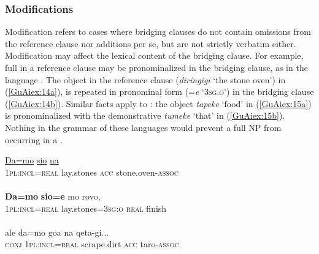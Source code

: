 \documentclass[output=paper]{LSP/langsci}
\begin{document}
\subsubsection{Modifications}
\label{GuAi311modif}
Modification refers to cases where bridging clauses do not contain omissions from the reference clause nor additions per se, but are not strictly verbatim either. Modification may affect the lexical content of the bridging clause. For example, full  in a reference clause may be pronominalized in the bridging clause, as in the  language . The object in the reference clause (\textit{diringigi} `the stone oven') in (\ref{GuAiex:14a}), is repeated in pronominal form (=\textit{e} `\textsc{3sg.o}') in the bridging clause (\ref{GuAiex:14b}). Similar facts apply to : the object \textit{tapeke} `food' in (\ref{GuAiex:15a}) is pronominalized with the demonstrative \textit{tumeke} `that' in (\ref{GuAiex:15b}). Nothing in the grammar of these languages would prevent a full NP from occurring in a .


\begin{exe}
\ex \label{GuAiex:14ac}
\begin{xlist}
\ex \label{GuAiex:14a}
\gll \underline{Da=mo}     \underline{sio}     \underline{na}   \underline{}\\
\textsc{1pl:incl=real}    lay.stones   \textsc{acc}   stone.oven-\textsc{assoc}\\
\glt {} \\
\ex \label{GuAiex:14b}
\gll \textbf{Da=mo}    \textbf{sio=e}  mo   rovo,  \\
\textsc{1pl:incl=real}   lay.stones=\textsc{3sg:o}   \textsc{real}   finish  \\
\glt {}\\
\ex \label{GuAiex:14c}
\gll ale   da=mo     goa    na   qeta-gi... \\
\textsc{conj}   \textsc{1pl:incl=real}    scrape.dirt  \textsc{acc}   taro-\textsc{assoc}\\
\glt {}
\end{xlist}
\end{exe}
\end{document}
